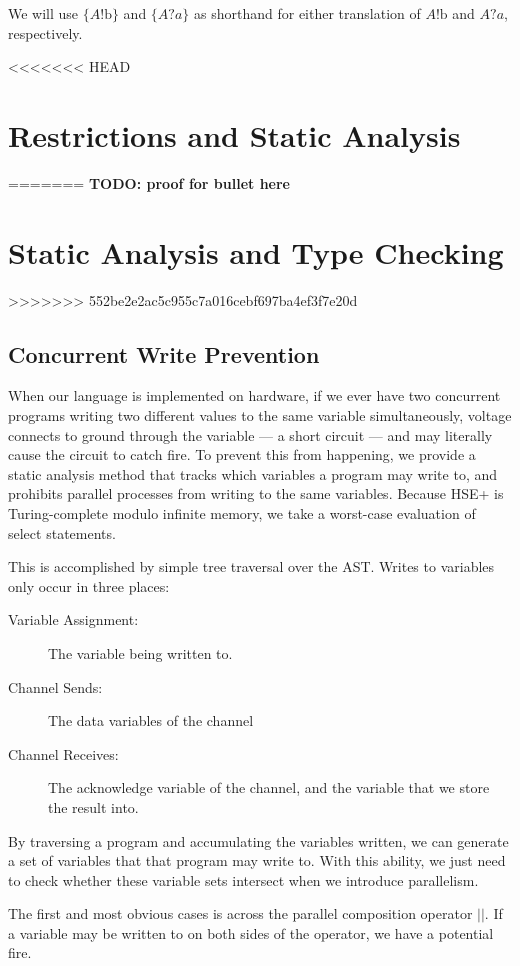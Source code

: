 \documentclass[times, 10pt]{article}
\begin{document}
We will use $\{A!\mathrm{b}\}$ and $\{A?a\}$ as shorthand for either translation
of $A!\mathrm{b}$ and $A?a$, respectively.

<<<<<<< HEAD
\section{Restrictions and Static Analysis}
=======
{\bf
TODO: proof for bullet here
}

\section{Static Analysis and Type Checking}
>>>>>>> 552be2e2ac5c955c7a016cebf697ba4ef3f7e20d

\subsection{Concurrent Write Prevention}

When our language is implemented on hardware, if we ever have two concurrent
programs writing two different values to the same variable simultaneously,
voltage connects to ground through the variable --- a short circuit --- and may
literally cause the circuit to catch fire.  To prevent this from happening, we
provide a static analysis method that tracks which variables a program may write
to, and prohibits parallel processes from writing to the same variables.
Because HSE+ is Turing-complete modulo infinite memory, we take a worst-case
evaluation of select statements.

This is accomplished by simple tree traversal over the AST.  Writes to variables
only occur in three places:

\begin{description}
\item[Variable Assignment:] The variable being written to.
\item[Channel Sends:] The data variables of the channel
\item[Channel Receives:] The acknowledge variable of the channel, and the
variable that we store the result into.
\end{description}

By traversing a program and accumulating the variables written, we can generate
a set of variables that that program may write to.  With this ability, we just
need to check whether these variable sets intersect when we introduce
parallelism.

The first and most obvious cases is across the parallel composition operator
$||$.  If a variable may be written to on both sides of the operator, we have a
potential fire.
\end{document}
